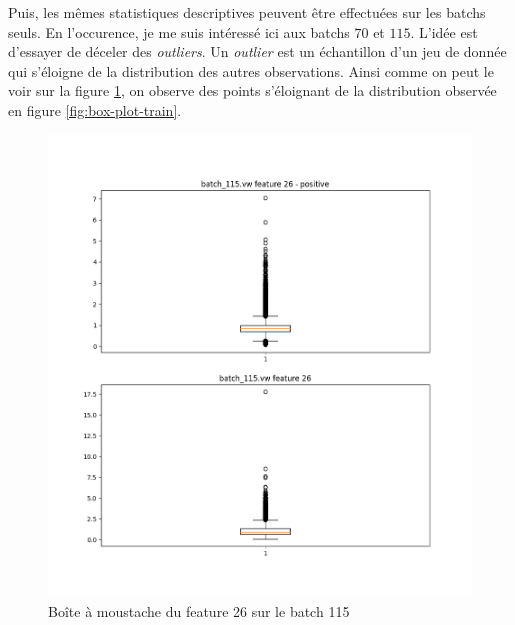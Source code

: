         Puis, les mêmes statistiques descriptives peuvent être effectuées sur les batchs seuls. En l'occurence, je me suis intéressé ici aux batchs $70$ et $115$. L'idée est d'essayer de déceler des \emph{outliers}. Un \emph{outlier} est un échantillon d'un jeu de donnée qui s'éloigne de la distribution des autres observations. Ainsi comme on peut le voir sur la figure \ref{fig:box-plot-train-115}, on observe des points s'éloignant de la distribution observée en figure \ref{fig:box-plot-train}.
         \begin{figure}[h]
            \centering
            \includegraphics[scale=0.50]{images/115_26.png}
            \caption{Boîte à moustache du feature 26 sur le batch 115}
            \label{fig:box-plot-train-115}
        \end{figure}
